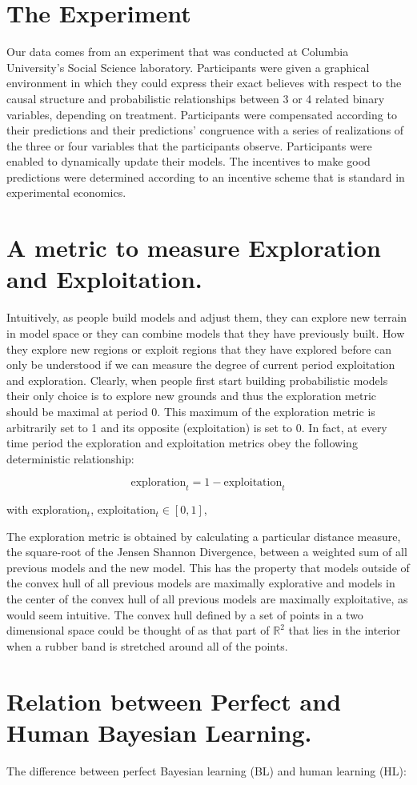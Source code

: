 \section{The Experiment} 

Our data comes from an experiment that was conducted at Columbia University's Social Science laboratory.  Participants were given a graphical environment in which they could express their exact believes with respect to the causal structure and probabilistic relationships between 3 or 4 related binary variables, depending on treatment.  Participants were compensated according to their predictions and their predictions' congruence with a series of realizations of the three or four variables that the participants observe.  Participants were enabled to dynamically update their models.   The incentives to make good predictions were determined according to an incentive scheme that is standard in experimental economics.  

\section{A metric to measure Exploration and Exploitation.}

Intuitively, as people build models and adjust them, they can explore new terrain in model space or they can combine models that they have previously built. How they explore new regions or exploit regions that they have explored before can only be understood if we can measure the degree of current period exploitation and exploration. Clearly, when people first start building probabilistic models their only choice is to explore new grounds and thus the exploration metric should be maximal at period 0. This maximum of the exploration metric is arbitrarily set to 1 and its opposite (exploitation) is set to 0. In fact, at every time period the exploration and exploitation metrics obey the following deterministic relationship:

$$\text{exploration}_t =1- \text{exploitation}_t$$

with exploration$_t$, exploitation$_t \in \left[0, 1 \right]$, 

The exploration metric is obtained by calculating a particular distance measure, the square-root of the Jensen Shannon Divergence, between a weighted sum of all previous models and the new model. This has the property that models outside of the convex hull of all previous models are maximally explorative and models in the center of the convex hull of all previous models are maximally exploitative, as would seem intuitive. The convex hull defined by a set of points in a two dimensional space could be thought of as that part of $\mathbb{R}^2$ that lies in the interior when a rubber band is stretched around all of the points.

\section{Relation between Perfect and Human Bayesian Learning.}

The difference between perfect Bayesian learning (BL) and human learning (HL):